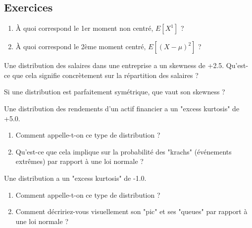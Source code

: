\subsection{Exercices}


\begin{exercicebox}
\begin{enumerate}
    \item À quoi correspond le 1er moment non centré, $E[X^1]$ ?
    \item À quoi correspond le 2ème moment centré, $E[(X-\mu)^2]$ ?
\end{enumerate}
\end{exercicebox}

\begin{exercicebox}
Une distribution des salaires dans une entreprise a un skewness de +2.5. Qu'est-ce que cela signifie concrètement sur la répartition des salaires ?
\end{exercicebox}

\begin{exercicebox}
Si une distribution est parfaitement symétrique, que vaut son skewness ?
\end{exercicebox}

\begin{exercicebox}
Une distribution des rendements d'un actif financier a un "excess kurtosis" de +5.0.
\begin{enumerate}
    \item Comment appelle-t-on ce type de distribution ?
    \item Qu'est-ce que cela implique sur la probabilité des "krachs" (événements extrêmes) par rapport à une loi normale ?
\end{enumerate}
\end{exercicebox}

\begin{exercicebox}
Une distribution a un "excess kurtosis" de -1.0.
\begin{enumerate}
    \item Comment appelle-t-on ce type de distribution ?
    \item Comment décririez-vous visuellement son "pic" et ses "queues" par rapport à une loi normale ?
\end{enumerate}
\end{exercicebox}

